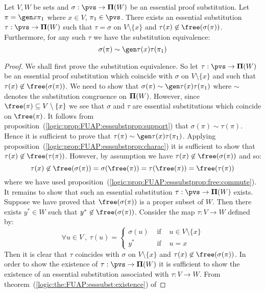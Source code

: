 \begin{prop}\label{logic:prop:FUAP:esssubstprop:tau}
Let $V,W$ be sets and $\sigma:\pvs\to{\bf\Pi}(W)$ be an essential
proof substitution. Let $\pi=\gen x\pi_{1}$ where $x\in V$,
$\pi_{1}\in\pvs$. There exists an essential substitution
$\tau:\pvs\to{\bf\Pi}(W)$ such that $\tau=\sigma$ on
$V\setminus\{x\}$ and $\tau(x)\not\in\free(\sigma(\pi))$.
Furthermore, for any such $\tau$ we have the substitution
equivalence:
    \[
    \sigma(\pi)\sim\gen\tau(x)\tau(\pi_{1})
    \]
\end{prop}
\begin{proof}
We shall first prove the substitution equivalence. So let
$\tau:\pvs\to{\bf\Pi}(W)$ be an essential proof substitution which
coincide with $\sigma$ on $V\setminus\{x\}$ and such that
$\tau(x)\not\in\free(\sigma(\pi))$. We need to show that
$\sigma(\pi)\sim\gen\tau(x)\tau(\pi_{1})$ where $\sim$ denotes the
substitution congruence on ${\bf\Pi}(W)$. However, since
$\free(\pi)\subseteq V\setminus\{x\}$ we see that $\sigma$ and
$\tau$ are essential substitutions which coincide on $\free(\pi)$.
It follows from
proposition~(\ref{logic:prop:FUAP:esssubstprop:support}) that
$\sigma(\pi)\sim\tau(\pi)$. Hence it is sufficient to prove that
$\tau(\pi)\sim\gen\tau(x)\tau(\pi_{1})$. Applying
proposition~(\ref{logic:prop:FUAP:esssubstprop:charac}) it is
sufficient to show that $\tau(x)\not\in\free(\tau(\pi))$. However,
by assumption we have $\tau(x)\not\in\free(\sigma(\pi))$ and so:
    \[
    \tau(x)\not\in\free(\sigma(\pi))=\sigma(\free(\pi))=\tau(\free(\pi))=\free(\tau(\pi))
    \]
where we have used
proposition~(\ref{logic:prop:FUAP:esssubstprop:free:commute}). It
remains to show that such an essential substitution
$\tau:\pvs\to{\bf\Pi}(W)$ exists. Suppose we have proved that
$\free(\sigma(\pi))$ is a proper subset of $W$. Then there exists
$y^{*}\in W$ such that $y^{*}\not\in\free(\sigma(\pi))$. Consider
the map $\tau:V\to W$ defined by:
    \[
    \forall u\in V\ ,\ \tau(u)=\left\{
        \begin{array}{lcl}
        \sigma(u)&\mbox{\ if\ }&u\in V\setminus\{x\}\\
        y^{*}&\mbox{\ if\ }&u=x
        \end{array}
    \right.
    \]
Then it is clear that $\tau$ coincides with $\sigma$ on
$V\setminus\{x\}$ and $\tau(x)\not\in\free(\sigma(\pi))$. In order
to show the existence of $\tau:\pvs\to{\bf\Pi}(W)$ it is sufficient
to show the existence of an essential substitution associated with
$\tau:V\to W$. From
theorem~(\ref{logic:the:FUAP:esssubst:existence}) of

\end{proof}

